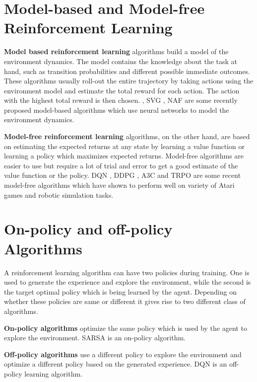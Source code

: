 \section{Model-based and Model-free Reinforcement Learning}
\textbf{Model based reinforcement learning} algorithms build a model of the environment dynamics. The model contains the knowledge about the task at hand, such as transition probabilities and different possible immediate outcomes. These algorithms usually roll-out the entire trajectory by taking actions using the environment model and estimate the total reward for each action. The action with the highest total reward is then chosen. \cite{Nagabandi2017NeuralND}, SVG \cite{svg}, NAF \cite{gu2016} are some recently proposed model-based algorithms which use neural networks to model the environment dynamics.
\linebreak

\noindent
\textbf{Model-free reinforcement learning} algorithms, on the other hand, are based on estimating the expected returns at any state by learning a value function or learning a policy which maximizes expected returns. Model-free algorithms are easier to use but require a lot of trial and error to get a good estimate of the value function or the policy. DQN \cite{01_dqn}, DDPG \cite{ddpg}, A3C \cite{a3c} and TRPO \cite{schulman2015trust} are some recent model-free algorithms which have shown to perform well on variety of Atari games and robotic simulation tasks.

\section{On-policy and off-policy Algorithms}
A reinforcement learning algorithm can have two policies during training. One is used to generate the experience and explore the environment, while the second is the target optimal policy which is being learned by the agent. Depending on whether these policies are same or different it gives rise to two different class of algorithms. 

\textbf{On-policy algorithms} optimize the same policy which is used by the agent to explore the environment. SARSA \cite{sutton1998reinforcement} is an on-policy algorithm.

\textbf{Off-policy algorithms} use a different policy to explore the environment and optimize a different policy based on the generated experience. DQN is an off-policy learning algorithm.

